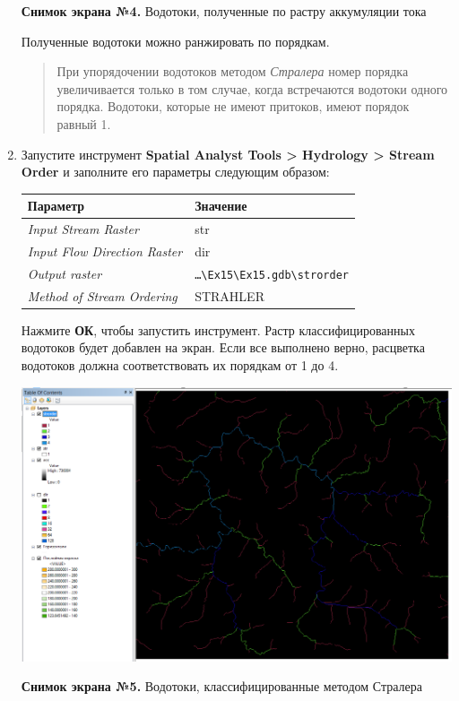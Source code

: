 \documentclass[12pt,]{book}
\begin{document}
\begin{enumerate}
  \textbf{Снимок экрана №4.} Водотоки, полученные по растру аккумуляции тока

  Полученные водотоки можно ранжировать по порядкам.

  \begin{quote}
  При упорядочении водотоков методом \emph{Стралера} номер порядка увеличивается только в том случае, когда встречаются водотоки одного порядка. Водотоки, которые не имеют притоков, имеют порядок равный 1.
  \end{quote}
\item
  Запустите инструмент \textbf{Spatial Analyst Tools \textgreater{} Hydrology \textgreater{} Stream Order} и заполните его параметры следующим образом:

  \begin{longtable}[]{@{}ll@{}}
  \toprule
  Параметр & Значение\tabularnewline
  \midrule
  \endhead
  \emph{Input Stream Raster} & str\tabularnewline
  \emph{Input Flow Direction Raster} & dir\tabularnewline
  \emph{Output raster} & \texttt{\ldots{}\textbackslash{}Ex15\textbackslash{}Ex15.gdb\textbackslash{}strorder}\tabularnewline
  \emph{Method of Stream Ordering} & STRAHLER\tabularnewline
  \bottomrule
  \end{longtable}

  Нажмите \textbf{ОК}, чтобы запустить инструмент. Растр классифицированных водотоков будет добавлен на экран. Если все выполнено верно, расцветка водотоков должна соответствовать их порядкам от 1 до 4.

  \includegraphics{images/Ex15/image15.png}

  \textbf{Снимок экрана №5.} Водотоки, классифицированные методом Стралера
\end{enumerate}
\end{document}
